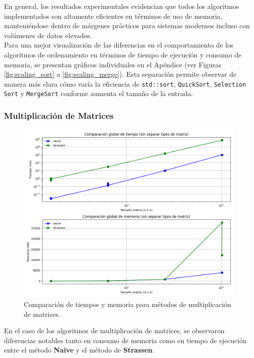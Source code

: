 En general, los resultados experimentales evidencian que todos los algoritmos implementados son altamente eficientes en términos de uso de memoria, manteniéndose dentro de márgenes prácticos para sistemas modernos incluso con volúmenes de datos elevados.
\\
Para una mejor visualización de las diferencias en el comportamiento de los algoritmos de ordenamiento en términos de tiempo de ejecución y consumo de memoria, se presentan gráficos individuales en el Apéndice (ver Figuras \ref{fig:scaling_sort} a \ref{fig:scaling_merge}). Esta separación permite observar de manera más clara cómo varía la eficiencia de \texttt{std::sort}, \texttt{QuickSort}, \texttt{Selection Sort} y \texttt{MergeSort} conforme aumenta el tamaño de la entrada.

\subsubsection{Multiplicación de Matrices}
\begin{figure}[H]
    \centering
    \includegraphics[width=\textwidth]{../code/matrix_multiplication/data/plots/comparacion_global_algoritmos.png}
    \caption{Comparación de tiempos y memoria para métodos de multiplicación de matrices.}
\end{figure}
En el caso de los algoritmos de multiplicación de matrices, se observaron diferencias notables tanto en consumo de memoria como en tiempo de ejecución entre el método \textbf{Naive} y el método de \textbf{Strassen}.

